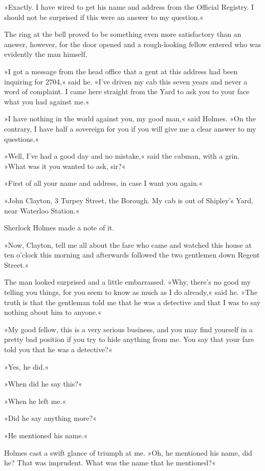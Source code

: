 »Exactly. I have wired to get his name and address from the Official Registry. I should not be surprised if this were an answer to my question.«

The ring at the bell proved to be something even more satisfactory than an answer, however, for the door opened and a rough-looking fellow entered who was evidently the man himself.

»I got a message from the head office that a gent at this address had been inquiring for 2704,« said he. »I've driven my cab this seven years and never a word of complaint. I came here straight from the Yard to ask you to your face what you had against me.«

»I have nothing in the world against you, my good man,« said Holmes. »On the contrary, I have half a sovereign for you if you will give me a clear answer to my questions.«

»Well, I've had a good day and no mistake,« said the cabman, with a grin. »What was it you wanted to ask, sir?«

»First of all your name and address, in case I want you again.«

»John Clayton, 3 Turpey Street, the Borough. My cab is out of Shipley's Yard, near Waterloo Station.«

Sherlock Holmes made a note of it.

»Now, Clayton, tell me all about the fare who came and watched this house at ten o'clock this morning and afterwards followed the two gentlemen down Regent Street.«

The man looked surprised and a little embarrassed. »Why, there's no good my telling you things, for you seem to know as much as I do already,« said he. »The truth is that the gentleman told me that he was a detective and that I was to say nothing about him to anyone.«

»My good fellow, this is a very serious business, and you may find yourself in a pretty bad position if you try to hide anything from me. You say that your fare told you that he was a detective?«

»Yes, he did.«

»When did he say this?«

»When he left me.«

»Did he say anything more?«

»He mentioned his name.«


Holmes cast a swift glance of triumph at me. »Oh, he mentioned his name, did he? That was imprudent. What was the name that he mentioned?«

